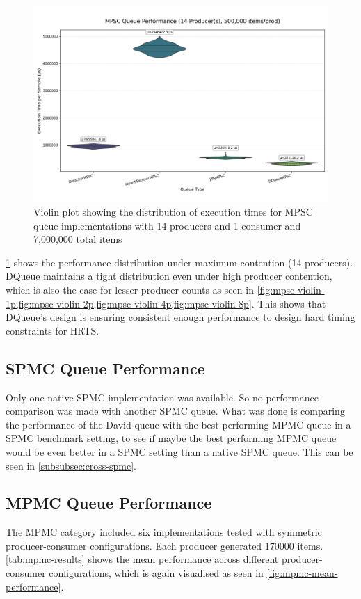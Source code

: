 \begin{figure}[htb]
\centering
\caption{Violin plot showing the distribution of execution times for MPSC queue implementations with 14 producers and 1 consumer and 7,000,000 total items}
\label{fig:mpsc-violin-14p}
\includegraphics[width=\textwidth]{images/results/mpsc_performance_violin_14_producers.png}
\end{figure}

\cref{fig:mpsc-violin-14p} shows the performance distribution under maximum contention (14 producers). DQueue maintains a tight distribution even under high producer contention, which is also the case for lesser producer counts as seen in \cref{fig:mpsc-violin-1p,fig:mpsc-violin-2p,fig:mpsc-violin-4p,fig:mpsc-violin-8p}. This shows that DQueue's design is ensuring consistent enough performance to design hard timing constraints for \ac{HRTS}.

\subsection{\acf{SPMC} Queue Performance}
Only one native \ac{SPMC} implementation was available. So no performance comparison was made with another \ac{SPMC} queue. What was done is comparing the performance of the David queue with the best performing \ac{MPMC} queue in a \ac{SPMC} benchmark setting, to see if maybe the best performing \ac{MPMC} queue would be even better in a \ac{SPMC} setting than a native \ac{SPMC} queue. This can be seen in \cref{subsubsec:cross-spmc}.

\subsection{\acf{MPMC} Queue Performance}
The \ac{MPMC} category included six implementations tested with symmetric producer-consumer configurations. Each producer generated 170000 items. \cref{tab:mpmc-results} shows the mean performance across different producer-consumer configurations, which is again visualised as seen in \cref{fig:mpmc-mean-performance}.

